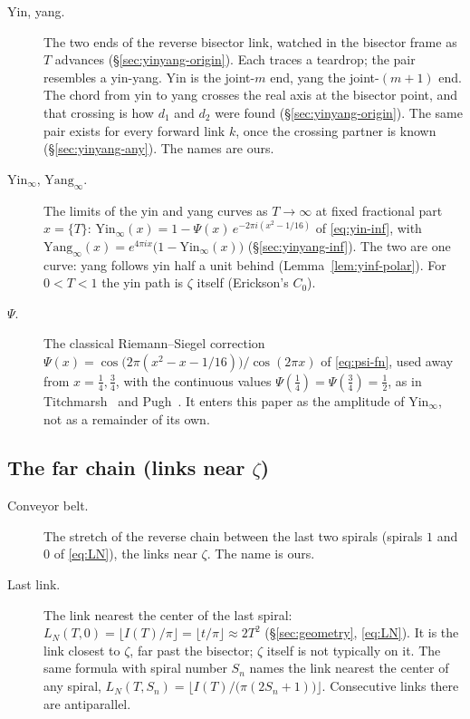 \documentclass[11pt]{article}
\theoremstyle{definition}
\begin{document}
\begin{description}
\item[Yin, yang.]
The two ends of the reverse bisector link, watched in the
bisector frame as $T$ advances
(\S\ref{sec:yinyang-origin}).
Each traces a teardrop; the pair resembles a yin-yang.
Yin is the joint-$m$ end, yang the joint-$(m+1)$ end.
The chord from yin to yang crosses the real axis at the bisector
point, and that crossing is how $d_1$ and $d_2$ were found
(\S\ref{sec:yinyang-origin}).
The same pair exists for every forward link $k$, once the crossing
partner is known (\S\ref{sec:yinyang-any}).
The names are ours.

\item[$\mathrm{Yin}_{\infty}$, $\mathrm{Yang}_{\infty}$.]
The limits of the yin and yang curves as $T\to\infty$ at fixed
fractional part $x=\{T\}$:
$\mathrm{Yin}_{\infty}(x)=1-\Psi(x)\,e^{-2\pi i(x^{2}-1/16)}$ of
\eqref{eq:yin-inf}, with
$\mathrm{Yang}_{\infty}(x)=e^{4\pi ix}\bigl(1-\mathrm{Yin}_{\infty}(x)\bigr)$
(\S\ref{sec:yinyang-inf}).
The two are one curve: yang follows yin half a unit behind
(Lemma~\ref{lem:yinf-polar}).
For $0<T<1$ the yin path is $\zeta$ itself (Erickson's $C_0$).

\item[$\Psi$.]
The classical Riemann--Siegel correction
$\Psi(x)=\cos\bigl(2\pi(x^{2}-x-1/16)\bigr)/\cos(2\pi x)$
of \eqref{eq:psi-fn},
used away from $x=\tfrac14,\tfrac34$, with the continuous values
$\Psi(\tfrac14)=\Psi(\tfrac34)=\tfrac12$,
as in Titchmarsh~\cite[\S15.3]{Titchmarsh1986} and
Pugh~\cite[\S5.4.1]{Pugh1998}.
It enters this paper as the amplitude of $\mathrm{Yin}_{\infty}$,
not as a remainder of its own.

\end{description}

\subsection*{The far chain (links near $\zeta$)}

\begin{description}
\item[Conveyor belt.]
The stretch of the reverse chain between the last two spirals
(spirals $1$ and $0$ of \eqref{eq:LN}), the links near $\zeta$.
The name is ours.

\item[Last link.]
The link nearest the center of the last spiral:
$L_N(T,0)=\lfloor I(T)/\pi\rfloor=\lfloor t/\pi\rfloor\approx 2T^{2}$
(\S\ref{sec:geometry}, \eqref{eq:LN}).
It is the link closest to $\zeta$, far past the bisector; $\zeta$
itself is not typically on it.
The same formula with spiral number $S_n$ names the link nearest the
center of any spiral,
$L_N(T,S_n)=\bigl\lfloor I(T)/\bigl(\pi(2S_n+1)\bigr)\bigr\rfloor$.
Consecutive links there are antiparallel.
\end{description}
\end{document}
